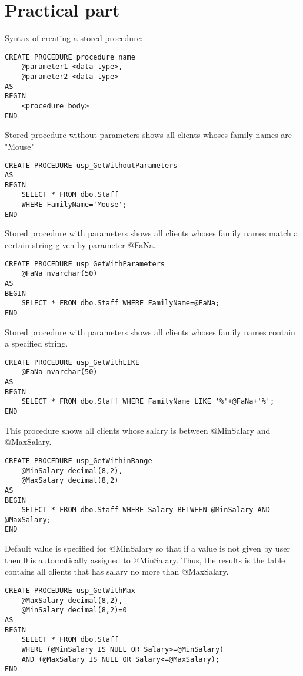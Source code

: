 \documentclass[10pt,a4paper]{article}
\begin{document}
\section{Practical part}
Syntax of creating a stored procedure:
\begin{lstlisting}
CREATE PROCEDURE procedure_name
	@parameter1 <data type>,
	@parameter2 <data type>
AS
BEGIN
	<procedure_body>
END
\end{lstlisting}
Stored procedure without parameters shows all clients whoses family names are "Mouse"
\begin{lstlisting}
CREATE PROCEDURE usp_GetWithoutParameters 
AS
BEGIN
	SELECT * FROM dbo.Staff
	WHERE FamilyName='Mouse';
END
\end{lstlisting}
Stored procedure with parameters shows all clients whoses family names match a certain string given by parameter @FaNa.
\begin{lstlisting}
CREATE PROCEDURE usp_GetWithParameters 
	@FaNa nvarchar(50)
AS
BEGIN
	SELECT * FROM dbo.Staff WHERE FamilyName=@FaNa;
END
\end{lstlisting}
Stored procedure with parameters shows all clients whoses family names contain a specified string.
\begin{lstlisting}
CREATE PROCEDURE usp_GetWithLIKE 
	@FaNa nvarchar(50)
AS
BEGIN
	SELECT * FROM dbo.Staff WHERE FamilyName LIKE '%'+@FaNa+'%';
END
\end{lstlisting}
This procedure shows all clients whose salary is between @MinSalary and @MaxSalary.
\begin{lstlisting}
CREATE PROCEDURE usp_GetWithinRange 
	@MinSalary decimal(8,2),
	@MaxSalary decimal(8,2)
AS
BEGIN
	SELECT * FROM dbo.Staff WHERE Salary BETWEEN @MinSalary AND @MaxSalary;
END
\end{lstlisting}
Default value is specified for @MinSalary so that if a value is not given by user then 0 is automatically assigned to @MinSalary. Thus, the results is the table contains all clients that has salary no more than @MaxSalary.
\begin{lstlisting}
CREATE PROCEDURE usp_GetWithMax 
	@MaxSalary decimal(8,2),
	@MinSalary decimal(8,2)=0
AS
BEGIN
	SELECT * FROM dbo.Staff 
	WHERE (@MinSalary IS NULL OR Salary>=@MinSalary)
	AND (@MaxSalary IS NULL OR Salary<=@MaxSalary);
END
\end{lstlisting}
\end{document}
